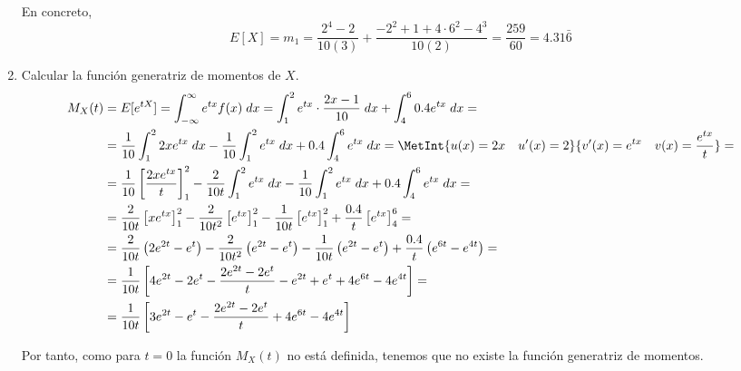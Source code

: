\begin{ejercicio}
\begin{enumerate}
        En concreto,
        \begin{equation*}
            E[X] = m_1 = \frac{2^{4}-2}{10(3)} + \frac{-2^{2} + 1 +4\cdot 6^{2}-4^{3}}{10(2)} = \frac{259}{60} = 4.31\bar{6}
        \end{equation*}

        \item Calcular la función generatriz de momentos de $X$.
        \begin{equation*}\begin{split}
            M_X(t) &= E[e^{tX}] = \int_{-\infty}^{\infty}e^{tx}f(x)\;dx = \int_{1}^2e^{tx}\cdot \frac{2x-1}{10}\;dx + \int_4^6 0.4e^{tx}\;dx =\\
            &= \frac{1}{10}\int_{1}^2 2xe^{tx}\;dx -\frac{1}{10}\int_1^2 e^{tx}\;dx + 0.4\int_4^6 e^{tx}\;dx
            = \MetInt{u(x)=2x\quad u'(x)=2}{v'(x)=e^{tx}\quad v(x)=\frac{e^{tx}}{t}} =\\
            &= \frac{1}{10}\left[\frac{2xe^{tx}}{t}\right]_1^2 - \frac{2}{10t}\int_1^2 e^{tx}\;dx -\frac{1}{10}\int_1^2 e^{tx}\;dx +0.4\int_4^6 e^{tx}\;dx  =\\
            &= \frac{2}{10t}\left[xe^{tx}\right]_1^2 -\frac{2}{10t^2}\left[e^{tx}\right]_1^2 -\frac{1}{10t}\left[e^{tx}\right]_1^2 +\frac{0.4}{t}\left[e^{tx}\right]_4^6 =\\
            &= \frac{2}{10t}\left(2e^{2t} -e^t\right) -\frac{2}{10t^2}\left(e^{2t} -e^t\right) -\frac{1}{10t}\left(e^{2t} -e^t\right) +\frac{0.4}{t}\left(e^{6t} -e^{4t}\right) =\\
            &= \frac{1}{10t}\left[4e^{2t} -2e^t -\frac{2e^{2t}-2e^t}{t} -e^{2t} +e^t +4e^{6t} -4e^{4t}\right] =\\
            &= \frac{1}{10t}\left[3e^{2t} -e^t -\frac{2e^{2t}-2e^t}{t} +4e^{6t} -4e^{4t}\right]
        \end{split}\end{equation*}

        Por tanto, como para $t=0$ la función $M_X(t)$ no está definida, tenemos que no existe la función generatriz de momentos.
    \end{enumerate}
\end{ejercicio}


